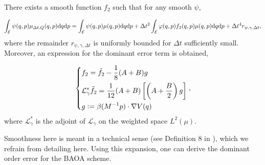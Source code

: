 \begin{theorem}
  \label{thm:baoab_error}
  There exists a smooth function $f_2$ such that for any smooth $\psi$,

  \begin{equation}
    \label{BAOAB expansion}
   \int_{\mathcal E}\psi(q,p) \mu_{\Delta t,Q}(q,p) \text  dq \mathrm{d}p=\int_{\mathcal E}\psi(q,p)\mu(q,p)\mathrm{d}q \mathrm{d}p+\Delta t^2\int_{\mathcal E}\varphi(q,p) f_2(q,p)\mu(q,p)\mathrm{d}q \mathrm{d}p + \Delta t^4 r_{\psi,\gamma,\Delta t},
  \end{equation}
  where the remainder $r_{\psi,\gamma,\Delta t}$ is uniformly bounded for $\Delta t$ sufficiently small. Moreover, an expression for the dominant error term is obtained, 
  
  \begin{equation}
    \label{remainder term}
    \left\{\begin{aligned}
    &f_2=\tilde f_2-\frac18(A+B)g\\
    &\mathcal L^{*}_\gamma\tilde f_2=\frac1{12}(A+B)\left[\left(A+\frac B2\right)g\right]\\
    &g\mathrel{\mathop:}=\beta(M^{-1}p)\cdot \nabla V(q)
    \end{aligned}\right.,
  \end{equation}
  where $\mathcal L^*_\gamma$ is the adjoint of $\mathcal L_\gamma$ on the weighted space $L^2(\mu)$.  
\end{theorem}
 Smoothness here is meant in a technical sense (see Definition 8 in \cite{LMS13}), which we refrain from detailing here. Using this expansion, one can derive the dominant order error for the BAOA scheme.


